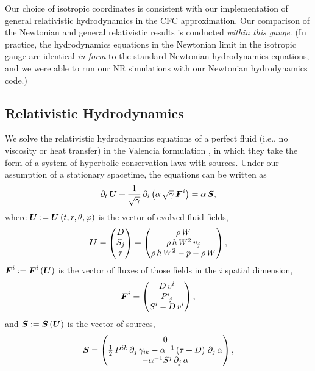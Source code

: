 Our choice of isotropic coordinates is consistent with our implementation of general
relativistic hydrodynamics in the CFC approximation.
Our comparison of the Newtonian and general relativistic results is conducted
{\em within this gauge}.
(In practice, the hydrodynamics equations in the Newtonian limit in the isotropic gauge
are identical {\em in form} to the standard Newtonian hydrodynamics equations,
and we were able to run our NR simulations with our Newtonian hydrodynamics code.)

\subsection{Relativistic Hydrodynamics}

We solve the relativistic hydrodynamics equations
of a perfect fluid (i.e., no viscosity or heat transfer)
in the Valencia formulation
\citep{bfi1997,rz2013}, in which they take the form of a
system of hyperbolic conservation laws with sources. Under our assumption of
a stationary spacetime, the equations can be written as
\begin{equation}\label{eq.AP.cLaws}
  \partial_{t}\,\boldsymbol{U}
  +\frac{1}{\sqrt{\gamma}}\,
  \partial_{i}\left(\alpha\,\sqrt{\gamma}\,\boldsymbol{F}^{i}\right)=\alpha\,\boldsymbol{S},
\end{equation}
where $\boldsymbol{U}:=\boldsymbol{U}\left(t,r,\theta,\varphi\right)$
is the vector of evolved fluid fields,
\begin{equation}
  \boldsymbol{U}
  =\begin{pmatrix}
  D\\
  S_{j}\\
  \tau
  \end{pmatrix}
  =\begin{pmatrix}
  \rho\,W\\
  \rho\,h\,W^{2}\,v_{j}\\
  \rho\,h\,W^{2}-p-\rho\,W
  \end{pmatrix},
\end{equation}
$\boldsymbol{F}^{i}:=\boldsymbol{F}^{i}\left(\boldsymbol{U}\right)$ is the vector of fluxes of those
fields in the $i$\th{} spatial dimension,
\begin{equation}
  \boldsymbol{F}^{i}
  =\begin{pmatrix}
  D\,v^{i}\\
  P^{i}_{~j}\\
  S^{i}-D\,v^{i}
  \end{pmatrix},
\end{equation}
and $\boldsymbol{S}:=\boldsymbol{S}\left(\boldsymbol{U}\right)$ is the vector of sources,
\begin{equation}
  \boldsymbol{S}
  =\begin{pmatrix}
  0\\
  \frac{1}{2}\,P^{ik}\,\partial_{j}\,\gamma_{ik}
  -\alpha^{-1}\left(\tau+D\right)\,\partial_{j}\,\alpha\\
  -\alpha^{-1}S^{j}\,\partial_{j}\,\alpha
  \end{pmatrix},
\end{equation}
